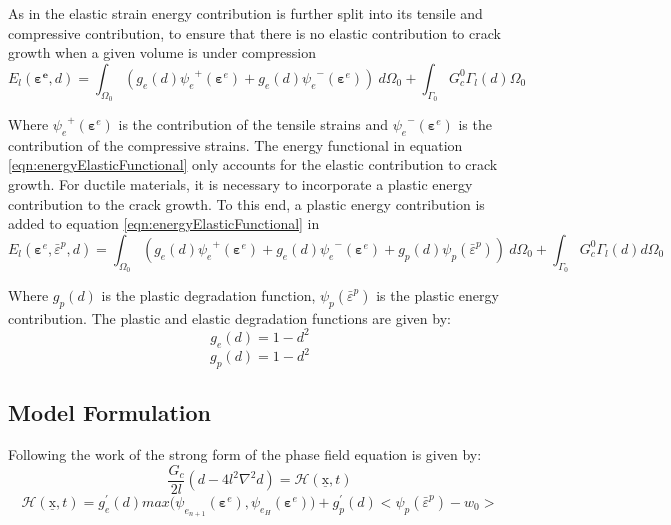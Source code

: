 \documentclass[sn-mathphys,Numbered,draft]{sn-jnl}%
\begin{document}
As in \citet{amor_regularized_2009,miehe_phase_2010-1} the elastic strain energy contribution is further split into its tensile and compressive contribution, to ensure that there is no elastic contribution to crack growth when a given volume is under compression
\begin{equation}
\label{eqn:energyElasticFunctional}
E_l\left(\mathbf{\boldsymbol{\varepsilon}^e},d\right)=\int_{\Omega_0}\left(g_e\left(d\right){\psi_e}^+\left(\boldsymbol{\varepsilon}^e\right)+g_e\left(d\right){\psi_e}^-\left(\boldsymbol{\varepsilon}^e\right)\right)\ d\Omega_0+\int_{\Gamma_0}{G_c^0\Gamma_l\left(d\right)\Omega_0}	
\end{equation}

Where ${\psi_e}^+\left(\boldsymbol{\varepsilon}^e\right)$ is the contribution of the tensile strains and ${\psi_e}^-\left(\boldsymbol{\varepsilon}^e\right)$ is the contribution of the compressive strains. The energy functional in equation \ref{eqn:energyElasticFunctional} only accounts for the elastic contribution to crack growth. For ductile materials, it is necessary to incorporate a plastic energy contribution to the crack growth. To this end, a plastic energy contribution is added to equation \ref{eqn:energyElasticFunctional} in \citet{borden_phase-field_2016}
\begin{equation}
	E_l\left(\boldsymbol{\varepsilon}^e,{\bar{\varepsilon}}^p,d\right)=\int_{\Omega_0}\left(g_e\left(d\right){\psi_e}^+\left(\boldsymbol{\varepsilon}^e\right)+g_e\left(d\right){\psi_e}^-\left(\boldsymbol{\varepsilon}^e\right)+g_p\left(d\right)\psi_p\left({\bar{\varepsilon}}^p\right)\right)\ d\Omega_0+\int_{\Gamma_0}{G_c^0\Gamma_l\left(d\right)d\Omega_0}	
\end{equation}

Where $g_p\left(d\right)$ is the plastic degradation function, $\psi_p\left({\bar{\varepsilon}}^p\right)$ is the plastic energy contribution. 
The plastic and elastic degradation functions are given by:
\begin{equation}
	g_e\left(d\right)=1-d^2	
\end{equation}
\begin{equation}
	g_p\left(d\right)=1-d^2	
\end{equation}

\subsection{Model Formulation}

Following the work of \citet{borden_phase-field_2016}  the strong form of the phase field equation is given by:
\begin{equation}
\label{eqn:phaseFieldEquation}
	\frac{G_c}{2l}\left(d-4l^2\nabla^2d\right)=\mathcal{H}\left(\underline{\mathrm{x}},t\right)	
	\end{equation}
\begin{equation}
	\mathcal{H}\left(\underline{\mathrm{x}},t\right)=g_e^\prime\left(d\right)max{(\psi}_{e_{n+1}}\left(\mathbf{\varepsilon}^e\right),\psi_{e_H}\left(\mathbf{\varepsilon}^e\right))+g_p^\prime\left(d\right)<\psi_p({\bar{\varepsilon}}^p)-w_0>
\end{equation}
\end{document}

